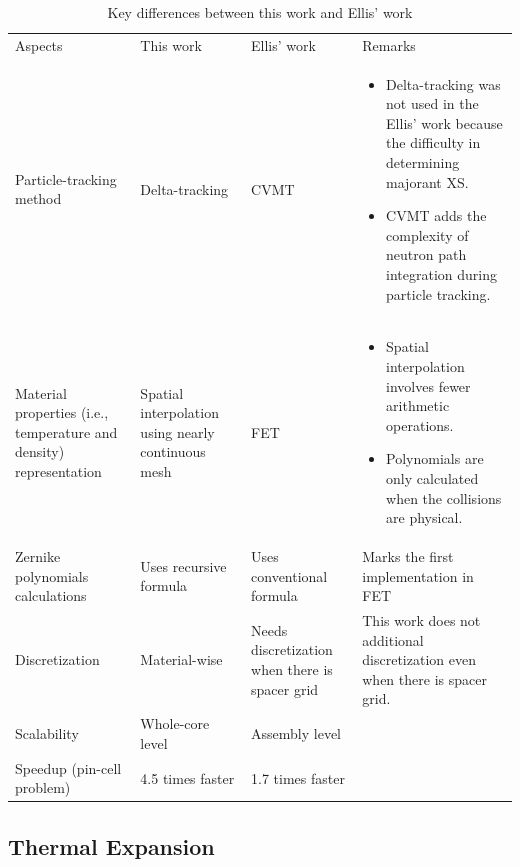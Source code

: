 \begin{table}
    \centering
    \setlength{\leftmargini}{0.2cm}
    \caption{Key differences between this work and Ellis' work}
    \label{tab_1q} 
    \begin{tabular}{| p{2.75cm} | m{2.75cm} | m{2.75cm} | m{6cm} | }
        \hline
        Aspects & This work & Ellis' work & Remarks \\
        \hhline{|=|=|=|=|}
        Particle-tracking method & Delta-tracking & CVMT & 
        \begin{itemize} 
            \item Delta-tracking was not used in the Ellis' work because the difficulty in determining majorant XS.
            \item CVMT adds the complexity of neutron path integration during particle tracking.
        \end{itemize} \\
        \hline
        Material properties (i.e., temperature and density) representation & Spatial interpolation using nearly continuous mesh & FET & 
        \begin{itemize} 
            \item Spatial interpolation involves fewer arithmetic operations.
            \item Polynomials are only calculated when the collisions are physical.
        \end{itemize} \\
        \hline
        Zernike polynomials calculations & Uses recursive formula & Uses conventional formula & Marks the first implementation in FET \\ \hline
        Discretization & Material-wise & Needs discretization when there is spacer grid & This work does not additional discretization even when there is spacer grid. \\ \hline
        Scalability & Whole-core level & Assembly level &  \\ \hline
        Speedup (pin-cell problem) & 4.5 times faster & 1.7 times faster &  \\ \hline
    \end{tabular}
\end{table}

\subsection{Thermal Expansion} \label{sec12}

